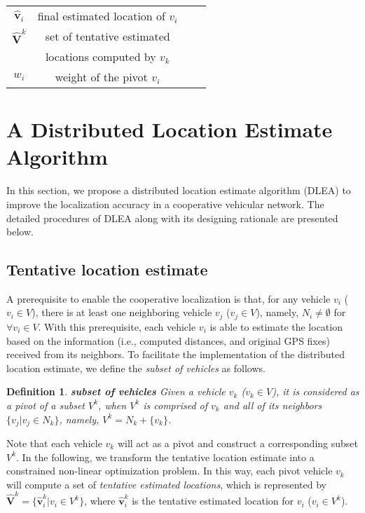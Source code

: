 \documentclass[letterpaper, 10 pt, conference]{ieeeconf}
\newtheorem{definition}{\hspace{1em}Definition}
\begin{document}
\begin {table}
\begin{tabular}{|l|l|l|l}
\cline{1-3}
\multicolumn{1}{|c|}{${\mathbf{\hat v}}_i $} & \multicolumn{1}{c|}{final estimated location of $v_i$} & \multicolumn{1}{c|}{} &  \\
\cline{1-3}
\multicolumn{1}{|c|}{${\mathbf{\hat V}}^k $} & \multicolumn{1}{c|}{set of tentative estimated } & \multicolumn{1}{c|}{} &  \\
\multicolumn{1}{|c|}{} & \multicolumn{1}{c|}{locations computed by $v_k$} & \multicolumn{1}{c|}{} &  \\
\cline{1-3}
\multicolumn{1}{|c|}{$w_i$} & \multicolumn{1}{c|}{weight of the pivot $v_i$} & \multicolumn{1}{c|}{} &  \\
\cline{1-3}
\end{tabular}
\end{table}
\normalsize


\section{A Distributed Location Estimate Algorithm} \label{alg}
In this section, we propose a distributed location estimate algorithm (DLEA) to improve the localization accuracy in a cooperative vehicular network. The detailed procedures of  DLEA along with its designing rationale are presented below.

\subsection{Tentative location estimate}
A prerequisite to enable the cooperative localization is that, for any vehicle $v_i$ ($v_i \in V$), there is at least one neighboring vehicle $v_j$ ($v_j \in V$),  namely, $N_i  \ne \emptyset $ for $\forall v_i  \in V$. With this prerequisite, each vehicle $v_i$ is able to estimate the location based on the information (i.e., computed distances, and original GPS fixes) received from its neighbors. To facilitate the implementation of the distributed location estimate, we define the \emph{subset of vehicles} as follows.

\begin{definition}\label{def1}
\textbf{subset of vehicles} Given a vehicle $v_k$ ($v_k \in V$), it is considered as a pivot of a subset  $V^k$, when $V^k$ is comprised of $v_k$ and all of its neighbors $\{ v_j |v_j  \in N_k \}$, namely,  $V^k  = N_k  + \{ v_k \}$.
\end{definition}


Note that each vehicle $v_k$ will act as a pivot and construct a corresponding subset $V^k$. In the following, we transform the tentative location estimate into a constrained non-linear optimization problem. In this way, each pivot vehicle $v_k$ will compute a set of \emph{tentative estimated locations}, which is represented by ${\mathbf{\hat V}}^k  = \{ {\mathbf{\hat v}}_i^k |v_i  \in V^k \} $, where ${\mathbf{\hat v}}_i^k $ is the tentative estimated location for $v_i$ ($v_i \in V^k$).
\end{document}
